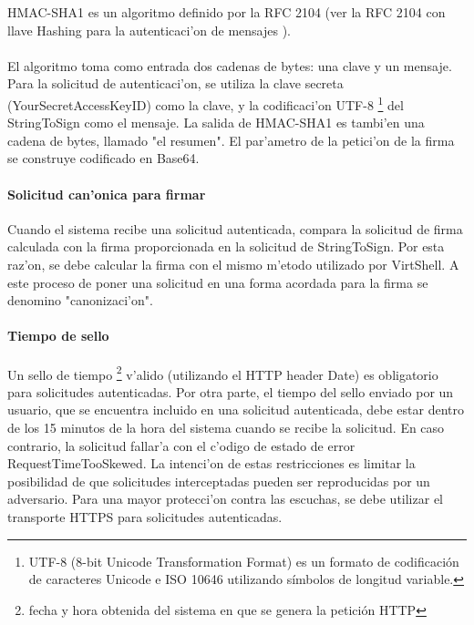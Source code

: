 HMAC-SHA1 es un algoritmo definido por la RFC 2104 (ver la RFC 2104 con llave Hashing para la autenticaci'on de mensajes \cite{rfc2104}).\\
\\
El algoritmo toma como entrada dos cadenas de bytes: una clave y un mensaje. Para la solicitud de autenticaci'on, se utiliza la clave secreta (YourSecretAccessKeyID) como la clave, y la codificaci'on UTF-8 \footnote{UTF-8 (8-bit Unicode Transformation Format) es un formato de codificación de caracteres Unicode e ISO 10646 utilizando símbolos de longitud variable.} del StringToSign como el mensaje. La salida de HMAC-SHA1 es tambi'en una cadena de bytes, llamado "el resumen". El par'ametro de la petici'on de la firma se construye codificado en Base64.

\paragraph{Solicitud can'onica para firmar}

Cuando el sistema recibe una solicitud autenticada, compara la solicitud de firma calculada con la firma proporcionada en la solicitud de StringToSign. Por esta raz'on, se debe calcular la firma con el mismo m'etodo utilizado por VirtShell. A este proceso de poner una solicitud en una forma acordada para la firma se denomino "canonizaci'on".

\paragraph{Tiempo de sello}

Un sello de tiempo \footnote{fecha y hora obtenida del sistema en que se genera la petición HTTP} v'alido (utilizando el HTTP header Date) es obligatorio para solicitudes autenticadas. Por otra parte, el tiempo del sello enviado por un usuario, que se encuentra incluido en una solicitud autenticada, debe estar dentro de los 15 minutos de la hora del sistema cuando se recibe la solicitud. En caso contrario, la solicitud fallar'a con el c'odigo de estado de error RequestTimeTooSkewed. La intenci'on de estas restricciones es limitar la posibilidad de que solicitudes interceptadas pueden ser reproducidas por un adversario. Para una mayor protecci'on contra las escuchas, se debe utilizar el transporte HTTPS para solicitudes autenticadas.


